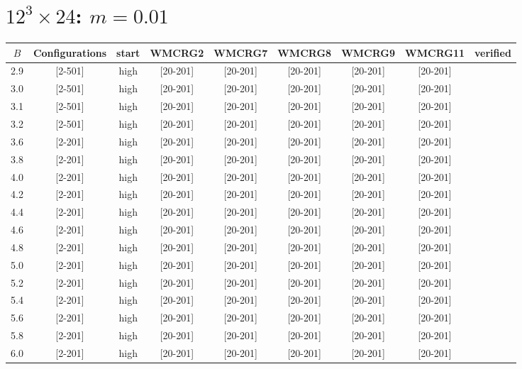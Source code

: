 \documentclass{article}
\begin{document}
  \section*{$12^3\times24$:  $m=0.01$}
    \begin{tabular}{| c | c | c | c | c | c | c | c | c |}
      \hline
      $B$ & Configurations & start & WMCRG2 & WMCRG7 & WMCRG8 & WMCRG9 & WMCRG11 & verified\\
      \hline
      2.9 & [2-501] & high & [20-201] & [20-201] & [20-201] & [20-201] & [20-201] &\\
      3.0 & [2-501] & high & [20-201] & [20-201] & [20-201] & [20-201] & [20-201] &\\
      3.1 & [2-501] & high & [20-201] & [20-201] & [20-201] & [20-201] & [20-201] &\\
      3.2 & [2-501] & high & [20-201] & [20-201] & [20-201] & [20-201] & [20-201] &\\
      3.6 & [2-201] & high & [20-201] & [20-201] & [20-201] & [20-201] & [20-201] &\\
      3.8 & [2-201] & high & [20-201] & [20-201] & [20-201] & [20-201] & [20-201] &\\
      4.0 & [2-201] & high & [20-201] & [20-201] & [20-201] & [20-201] & [20-201] &\\
      4.2 & [2-201] & high & [20-201] & [20-201] & [20-201] & [20-201] & [20-201] &\\
      4.4 & [2-201] & high & [20-201] & [20-201] & [20-201] & [20-201] & [20-201] &\\
      4.6 & [2-201] & high & [20-201] & [20-201] & [20-201] & [20-201] & [20-201] &\\
      4.8 & [2-201] & high & [20-201] & [20-201] & [20-201] & [20-201] & [20-201] &\\
      5.0 & [2-201] & high & [20-201] & [20-201] & [20-201] & [20-201] & [20-201] &\\
      5.2 & [2-201] & high & [20-201] & [20-201] & [20-201] & [20-201] & [20-201] &\\
      5.4 & [2-201] & high & [20-201] & [20-201] & [20-201] & [20-201] & [20-201] &\\
      5.6 & [2-201] & high & [20-201] & [20-201] & [20-201] & [20-201] & [20-201] &\\
      5.8 & [2-201] & high & [20-201] & [20-201] & [20-201] & [20-201] & [20-201] &\\
      6.0 & [2-201] & high & [20-201] & [20-201] & [20-201] & [20-201] & [20-201] &\\

\end{tabular}
\end{document}

